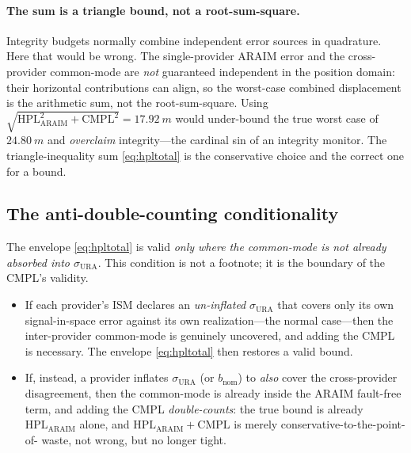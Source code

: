 \paragraph{The sum is a triangle bound, not a root-sum-square.}
Integrity budgets normally combine independent error sources in quadrature. Here that
would be wrong. The single-provider ARAIM error and the cross-provider common-mode are
\emph{not} guaranteed independent in the position domain: their horizontal
contributions can align, so the worst-case combined displacement is the arithmetic sum,
not the root-sum-square. Using $\sqrt{\mathrm{HPL}_{\mathrm{ARAIM}}^2+\mathrm{CMPL}^2}
=\SI{17.92}{m}$ would under-bound the true worst case of $\SI{24.80}{m}$ and
\emph{overclaim} integrity---the cardinal sin of an integrity monitor. The
triangle-inequality sum \eqref{eq:hpltotal} is the conservative choice and the correct
one for a bound.

\subsection{The anti-double-counting conditionality}
\label{sec:conditionality}

The envelope \eqref{eq:hpltotal} is valid \emph{only where the common-mode is not
already absorbed into $\sigma_{\mathrm{URA}}$}. This condition is not a footnote; it is
the boundary of the CMPL's validity.

\begin{itemize}
  \item If each provider's ISM declares an \emph{un-inflated} $\sigma_{\mathrm{URA}}$
  that covers only its own signal-in-space error against its own realization---the
  normal case---then the inter-provider common-mode is genuinely uncovered, and adding
  the CMPL is necessary. The envelope \eqref{eq:hpltotal} then restores a valid bound.

  \item If, instead, a provider inflates $\sigma_{\mathrm{URA}}$ (or $b_{\mathrm{nom}}$)
  to \emph{also} cover the cross-provider disagreement, then the common-mode is already
  inside the ARAIM fault-free term, and adding the CMPL \emph{double-counts}: the true
  bound is already $\mathrm{HPL}_{\mathrm{ARAIM}}$ alone, and
  $\mathrm{HPL}_{\mathrm{ARAIM}}+\mathrm{CMPL}$ is merely conservative-to-the-point-of-%
  waste, not wrong, but no longer tight.
\end{itemize}

